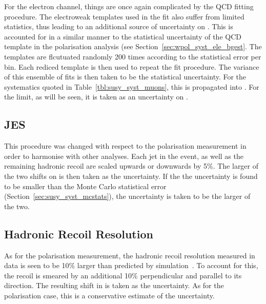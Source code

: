 For the electron channel, things are once again complicated by the \ac{QCD}
fitting procedure. The electroweak templates used in the fit also suffer from
limited statistics, thus leading to an additional source of uncertainty on
\NControl. This is accounted for in a similar manner to the statistical
uncertainty of the \ac{QCD} template in the \PW polarisation analysis (see
Section~\ref{sec:wpol_syst_ele_bgest}. The templates are flcutuated randomly 200
times according to the statistical error per bin. Each rediced template is then
used to repeat the fit procedure. The variance of this ensemble of fits is then
taken to be the statistical uncertainty. For the systematics quoted in
Table~\ref{tbl:susy_syst_muons}, this is propagated into \RCS. For the limit, as
will be seen, it is taken as an uncertainty on \NControl.

\subsection{\acl{JES}}
\label{sec:susy_jes_uncertainty}
This procedure was changed with respect to the \PW polarisation measurement in
order to harmonise with other analyses. Each jet in the event, as well as the
remaining hadronic recoil are scaled upwards or downwards by 5\%. The larger of
the two shifts on \RCS is then taken as the uncertainty. If the the uncertainty
is found to be smaller than the Monte Carlo statistical error
(Section~\ref{sec:susy_syst_mcstats}), the uncertainty is taken to be the larger
of the two.

\subsection{Hadronic Recoil Resolution}
\label{sec:susy_metres_uncertainty}
As for the \PW polarisation measurement, the hadronic recoil resolution measured
in data is seen to be 10\% larger than predicted by
simulation~\cite{cms_met_paper, cms_met_pas}. To account for this, the recoil is
smeared by an additional 10\% perpendicular and parallel to its direction. The
resulting shift in \RCS is taken as the uncertainty. As for the \PW polarisation
case, this is a conservative estimate of the uncertainty.

